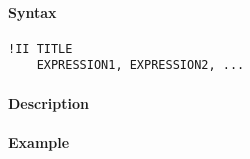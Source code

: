 


	\paragraph{Syntax}\label{syntax}

\begin{verbatim}
!II TITLE
    EXPRESSION1, EXPRESSION2, ...
\end{verbatim}

\paragraph{Description}\label{description}

\paragraph{Example}\label{example}


